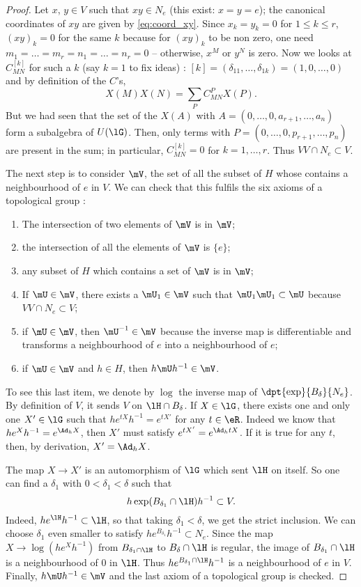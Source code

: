 \begin{proof}
Let $x$, $y\in V$ such that $xy\in N_e$ (this exist: $x=y=e$); the canonical coordinates of $xy$ are given by \eqref{eq:coord_xy}. Since $x_k=y_k=0$ for $1\leq k\leq r$, $(xy)_k=0$ for the same $k$ because for $(xy)_k$ to be non zero, one need $m_1=\ldots=m_r=n_1=\ldots=n_r=0$ -- otherwise, $x^M$ or $y^N$ is zero. Now we looks at $C^{[k]}_{MN}$ for such a $k$ (say $k=1$ to fix ideas) : $[k]=(\delta_{11},\ldots,\delta_{1k})=(1,0,\ldots,0)$ and by definition of the $C$'s,
\[
   X(M)X(N)=\sum_PC_{MN}^PX(P).
\]
But we had seen that the set of the $X(A)$ with $A=(0,\ldots,0,a_{r+1},\ldots,a_n)$ form a subalgebra of $U(\lG)$. Then, only terms with $P=(0,\ldots,0,p_{r+1},\ldots,p_n)$ are present in the sum; in particular, $C_{MN}^{[k]}=0$ for $k=1,\ldots,r$. Thus $VV\cap N_e\subset V$.

The next step is to consider $\mV$, the set of all the subset of $H$ whose contains a neighbourhood of $e$ in $V$. We can check that this fulfils the six axioms of a topological group :

\begin{enumerate}
\item The intersection of two elements of $\mV$ is in $\mV$;
\item the intersection of all the elements of $\mV$ is $\{e\}$;
\item any subset of $H$ which contains a set of $\mV$ is in $\mV$;
\item If $\mU\in\mV$, there exists a $\mU_1\in\mV$ such that $\mU_1\mU_1\subset\mU$ because $VV\cap N_e\subset V$;
\item if $\mU\in\mV$, then $\mU^{-1}\in\mV$ because the inverse map is differentiable and transforms a neighbourhood of $e$ into a neighbourhood of $e$;
\item if $\mU\in\mV$ and $h\in H$, then $h\mU h^{-1}\in\mV$.
\end{enumerate}

To see this last item, we denote by $\log$ the inverse map of $\dpt{\exp}{B_{\delta}}{N_e}$. By definition of $V$, it sends $V$ on $\lH\cap B_{\delta}$. If $X\in\lG$, there exists one and only one $X'\in\lG$ such that $he^{tX}h^{-1}=e^{tX'}$ for any $t\in\eR$. Indeed we know that $he^{X}h^{-1}=e^{\Ad_hX}$, then $X'$ must satisfy $e^{tX'}=e^{\Ad_htX}$. If it is true for any $t$, then, by derivation, $X'=\Ad_hX$.

The map $X\to X'$ is an automorphism of $\lG$ which sent $\lH$ on itself. So one can find a $\delta_1$ with $0<\delta_1<\delta$ such that 
\[
   h\exp({B_{\delta_1}\cap\lH})h^{-1}\subset V.
\]
Indeed, $he^{\lH} h^{-1}\subset\lH$, so that taking $\delta_1<\delta$, we get the strict inclusion. We can choose $\delta_1$ even smaller to satisfy $he^{B_{\delta_1}}h^{-1}\subset N_e$. Since the map $X\to\log(he^{X}h^{-1})$ from $B_{\delta_1\cap\lH}$ to $B_{\delta}\cap\lH$ is regular, the image of $B_{\delta_1}\cap\lH$ is a neighbourhood of $0$ in $\lH$. Thus $he^{B_{\delta_1}\cap\lH}h^{-1}$ is a neighbourhood of $e$ in $V$. Finally, $h\mU h^{-1}\in\mV$ and the last axiom of a topological group is checked.


\end{proof}
